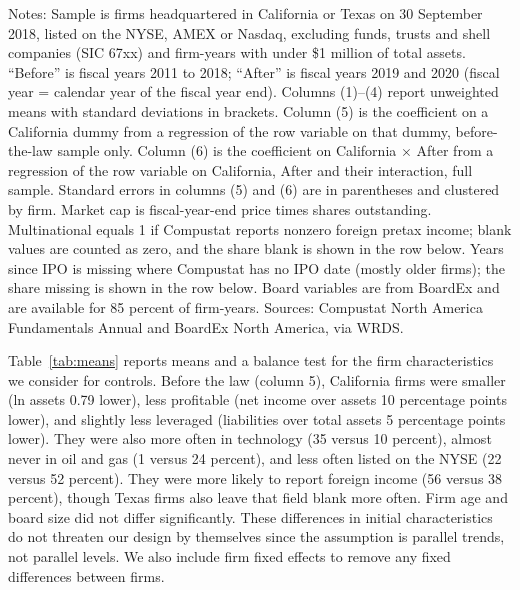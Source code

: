 \documentclass[12pt]{article}
\newcommand{\tablenotes}[1]{\par\vspace{4pt}\begin{minipage}{0.95\textwidth}\footnotesize #1\end{minipage}}
\begin{document}
\begin{table}[H]
\centering
\caption{Means and Balance Test: California vs.\ Texas, Before and After SB 826}
\label{tab:means}
\tablenotes{Notes: Sample is firms headquartered in California or Texas on 30 September 2018, listed on the NYSE, AMEX or Nasdaq, excluding funds, trusts and shell companies (SIC 67xx) and firm-years with under \$1 million of total assets. ``Before'' is fiscal years 2011 to 2018; ``After'' is fiscal years 2019 and 2020 (fiscal year = calendar year of the fiscal year end). Columns (1)--(4) report unweighted means with standard deviations in brackets. Column (5) is the coefficient on a California dummy from a regression of the row variable on that dummy, before-the-law sample only. Column (6) is the coefficient on California $\times$ After from a regression of the row variable on California, After and their interaction, full sample. Standard errors in columns (5) and (6) are in parentheses and clustered by firm. Market cap is fiscal-year-end price times shares outstanding. Multinational equals 1 if Compustat reports nonzero foreign pretax income; blank values are counted as zero, and the share blank is shown in the row below. Years since IPO is missing where Compustat has no IPO date (mostly older firms); the share missing is shown in the row below. Board variables are from BoardEx and are available for 85 percent of firm-years. Sources: Compustat North America Fundamentals Annual and BoardEx North America, via WRDS.}
\end{table}

Table~\ref{tab:means} reports means and a balance test for the firm characteristics we consider for controls. Before the law (column 5), California firms were smaller (ln assets 0.79 lower), less profitable (net income over assets 10 percentage points lower), and slightly less leveraged (liabilities over total assets 5 percentage points lower). They were also more often in technology (35 versus 10 percent), almost never in oil and gas (1 versus 24 percent), and less often listed on the NYSE (22 versus 52 percent). They were more likely to report foreign income (56 versus 38 percent), though Texas firms also leave that field blank more often. Firm age and board size did not differ significantly. These differences in initial characteristics do not threaten our design by themselves since the assumption is parallel trends, not parallel levels. We also include firm fixed effects to remove any fixed differences between firms.
\end{document}
